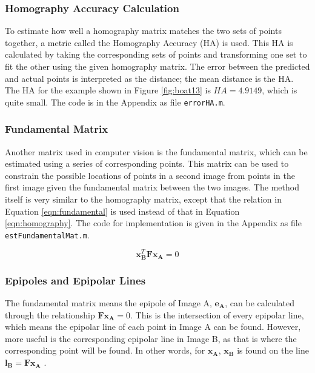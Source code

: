 \documentclass[a4paper, 10pt, conference]{ieeeconf}
\begin{document}
\subsubsection{Homography Accuracy Calculation}
To estimate how well a homography matrix matches the two sets of points together, a metric called the Homography Accuracy (HA) is used. This HA is calculated by taking the corresponding sets of points and transforming one set to fit the other using the given homography matrix. The error between the predicted and actual points is interpreted as the distance; the mean distance is the HA. The HA for the example shown in Figure \ref{fig:boat13} is $HA=4.9149$, which is quite small. The code is in the Appendix as file \texttt{errorHA.m}.

\subsubsection{Fundamental Matrix}
Another matrix used in computer vision is the fundamental matrix, which can be estimated using a series of corresponding points. This matrix can be used to constrain the possible locations of points in a second image from points in the first image given the fundamental matrix between the two images. The method itself is very similar to the homography matrix, except that the relation in Equation \ref{eqn:fundamental} is used instead of that in Equation \ref{eqn:homography}. The code for implementation is given in the Appendix as file \texttt{estFundamentalMat.m}.

\begin{equation} \label{eqn:fundamental}
    \textbf{x}_\textbf{B}^T\textbf{Fx}_\textbf{A} = 0
\end{equation}

\subsubsection{Epipoles and Epipolar Lines}
The fundamental matrix means the epipole of Image A, $\textbf{e}_\textbf{A}$, can be calculated through the relationship $\textbf{Fx}_\textbf{A} = 0$. This is the intersection of every epipolar line, which means the epipolar line of each point in Image A can be found. However, more useful is the corresponding epipolar line in Image B, as that is where the corresponding point will be found. In other words, for $\textbf{x}_\textbf{A}$, $\textbf{x}_\textbf{B}$ is found on the line $\textbf{l}_\textbf{B}=\textbf{Fx}_\textbf{A}$ \cite{mit}.
\end{document}
